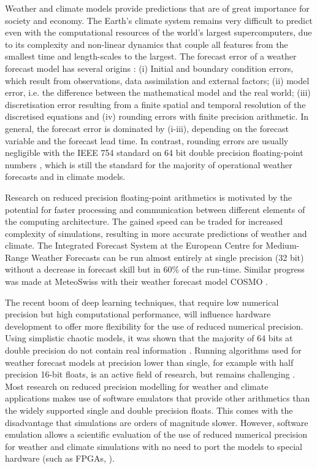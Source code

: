 \documentclass[draft]{agujournal2019}
\begin{document}
Weather and climate models provide predictions that are of great importance for society and economy. The Earth's climate system remains very difficult to predict even with the computational resources of the world's largest supercomputers, due to its complexity and non-linear dynamics that couple all features from the smallest time and length-scales to the largest. The forecast error of a weather forecast model has several origins \cite{Palmer2012a,Palmer2015}: (i) Initial and boundary condition errors, which result from observations, data assimilation and external factors; (ii) model error, i.e. the difference between the mathematical model and the real world; (iii) discretisation error resulting from a finite spatial and temporal resolution of the discretised equations and (iv) rounding errors with finite precision arithmetic. In general, the forecast error is dominated by (i-iii), depending on the forecast variable and the forecast lead time. In contrast, rounding errors are usually negligible with the IEEE 754 standard on 64 bit double precision floating-point numbers \cite{IEEE}, which is still the standard for the majority of operational weather forecasts and in climate models.

Research on reduced precision floating-point arithmetics is motivated by the potential for faster processing and communication between different elements of the computing architecture. The gained speed can be traded for increased complexity of simulations, resulting in more accurate predictions of weather and climate. The Integrated Forecast System at the European Centre for Medium-Range Weather Forecasts can be run almost entirely at single precision (32 bit) without a decrease in forecast skill \cite{Vana2017} but in 60\% of the run-time. Similar progress was made at MeteoSwiss with their weather forecast model COSMO \cite{Rudisuhli2013}. 

The recent boom of deep learning techniques, that require low numerical precision but high computational performance, will influence hardware development to offer more flexibility for the use of reduced numerical precision. Using simplistic chaotic models, it was shown that the majority of 64 bits at double precision do not contain real information \cite{Jeffress2017}. Running algorithms used for weather forecast models at precision lower than single, for example with half precision 16-bit floats, is an active field of research, but remains challenging \cite{Duben2014,Thornes2017,Hatfield2018,Duben2018}. Most research on reduced precision modelling for weather and climate applications makes use of software emulators \cite{Dawson2017} that provide other arithmetics than the widely supported single and double precision floats. This comes with the disadvantage that simulations are orders of magnitude slower. However, software emulation allows a scientific evaluation of the use of reduced numerical precision for weather and climate simulations with no need to port the models to special hardware (such as FPGAs, \cite{Russell2017}).
 
\end{document}
